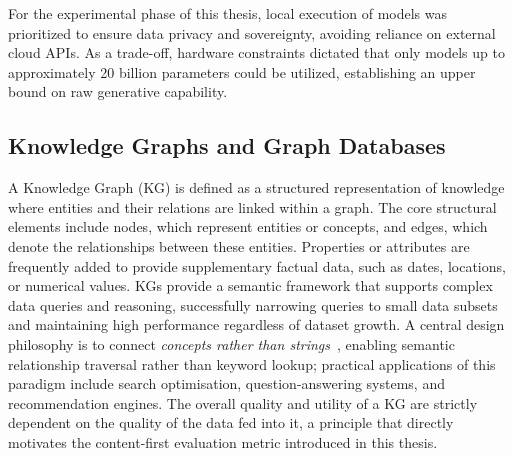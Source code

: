 ﻿\documentclass[11pt]{article}
\begin{document}
For the experimental phase of this thesis, local execution of models was prioritized to ensure data privacy and sovereignty, avoiding reliance on external cloud APIs. As a trade-off, hardware constraints dictated that only models up to approximately 20 billion parameters could be utilized, establishing an upper bound on raw generative capability.

\subsection{Knowledge Graphs and Graph Databases}
\label{sec:bg_kg}

A Knowledge Graph (KG) is defined as a structured representation of knowledge where entities and their relations are linked within a graph. The core structural elements include nodes, which represent entities or concepts, and edges, which denote the relationships between these entities. Properties or attributes are frequently added to provide supplementary factual data, such as dates, locations, or numerical values. KGs provide a semantic framework that supports complex data queries and reasoning, successfully narrowing queries to small data subsets and maintaining high performance regardless of dataset growth. A central design philosophy is to connect \emph{concepts rather than strings}~\cite{sullivan2021kg}, enabling semantic relationship traversal rather than keyword lookup; practical applications of this paradigm include search optimisation, question-answering systems, and recommendation engines. The overall quality and utility of a KG are strictly dependent on the quality of the data fed into it, a principle that directly motivates the content-first evaluation metric introduced in this thesis.
\end{document}
